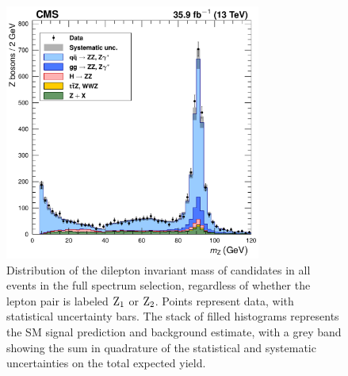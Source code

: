 \begin{figure}[htbp]
  \begin{center}
    \includegraphics[width=0.75\textwidth]{results/zMass.pdf}
    \caption[Mass of all {\Zgs} candidates in the full spectrum selection]{
        Distribution of the dilepton invariant mass of {\Zgs} candidates in all events in the full spectrum selection, regardless of whether the lepton pair is labeled $\mathrm{Z}_1$ or $\mathrm{Z}_2$.
        Points represent data, with statistical uncertainty bars.
        The stack of filled histograms represents the SM signal prediction and background estimate, with a grey band showing the sum in quadrature of the statistical and systematic uncertainties on the total expected yield.
      }\label{fig:zMass_full}
  \end{center}
\end{figure}

